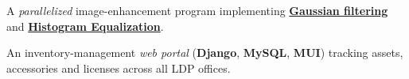 \documentclass[]{openfont}
\begin{document}
\begin{minipage}[t]{0.65\textwidth}
    \begin{tightemize}
        \item A \textit{parallelized} image-enhancement program implementing \href{https://en.wikipedia.org/wiki/Gaussian_filter}{\textbf{Gaussian filtering}} and \href{https://en.wikipedia.org/wiki/Histogram_equalization}{\textbf{Histogram Equalization}}.
    \end{tightemize}
    \sectionsep

    \begin{tightemize}
        \item An inventory-management \textit{web portal} (\textbf{Django}, \textbf{MySQL}, \textbf{MUI}) tracking assets, accessories and licenses across all LDP offices.
    \end{tightemize}


    \sectionsep

\end{minipage}
\end{document}
